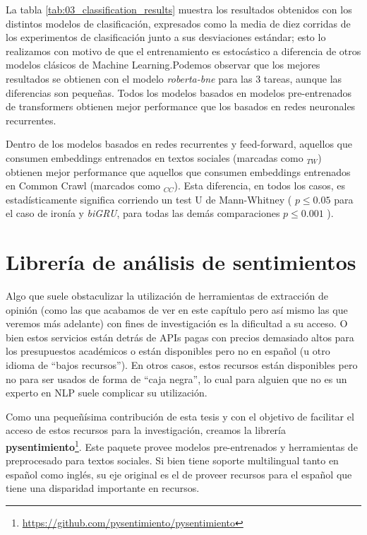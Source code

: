 La tabla \ref{tab:03_classification_results} muestra los resultados obtenidos con los distintos modelos de clasificación, expresados como la media de diez corridas de los experimentos de clasificación junto a sus desviaciones estándar; esto lo realizamos con motivo de que el entrenamiento es estocástico a diferencia de otros modelos clásicos de Machine Learning.Podemos observar que los mejores resultados se obtienen con el modelo \emph{roberta-bne} para las 3 tareas, aunque las diferencias son pequeñas. Todos los modelos basados en modelos pre-entrenados de transformers obtienen mejor performance que los basados en redes neuronales recurrentes.

Dentro de los modelos basados en redes recurrentes y feed-forward, aquellos que consumen embeddings entrenados en textos sociales (marcadas como $_{TW}$) obtienen mejor performance que aquellos que consumen embeddings entrenados en Common Crawl (marcados como $_{CC}$). Esta diferencia, en todos los casos, es estadísticamente significa corriendo un test U de Mann-Whitney ( $p \leq 0.05$ para el caso de ironía y \emph{biGRU}, para todas las demás comparaciones $p \leq 0.001$ ).




\section{Librería de análisis de sentimientos}

\newcommand{\pysentimiento}[0]{\textbf{pysentimiento}}

Algo que suele obstaculizar la utilización de herramientas de extracción de opinión (como las que acabamos de ver en este capítulo pero así mismo las que veremos más adelante) con fines de investigación es la dificultad a su acceso. O bien estos servicios están detrás de APIs pagas con precios demasiado altos para los presupuestos académicos o están disponibles pero no en español (u otro idioma de ``bajos recursos''). En otros casos, estos recursos están disponibles pero no para ser usados de forma de ``caja negra'', lo cual para alguien que no es un experto en NLP suele complicar su utilización.

Como una pequeñísima contribución de esta tesis y con el objetivo de facilitar el acceso de estos recursos para la investigación, creamos la librería \textbf{pysentimiento}\footnote{\url{https://github.com/pysentimiento/pysentimiento}}. Este paquete provee modelos pre-entrenados y herramientas de preprocesado para textos sociales. Si bien tiene soporte multilingual tanto en español como inglés, su eje original es el de proveer recursos para el español que tiene una disparidad importante en recursos.

